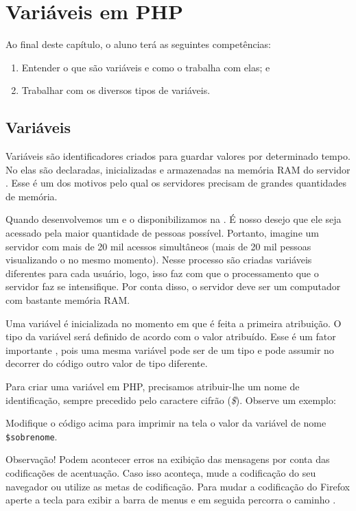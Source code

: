 \chapter{Variáveis em PHP}

Ao final deste capítulo, o aluno terá as seguintes competências:
\begin{enumerate}
    \item Entender o que são variáveis e como o \php trabalha com elas; e
    \item Trabalhar com os diversos tipos de variáveis.
\end{enumerate}

\section{Variáveis}
\label{variaveis}

Variáveis são identificadores criados para guardar valores por determinado tempo. 
No \php elas são declaradas, inicializadas e armazenadas na memória RAM do servidor \web. 
Esse é um dos motivos pelo qual os servidores precisam de grandes quantidades de memória.

Quando desenvolvemos um \site e o disponibilizamos na \internet. É nosso desejo que ele seja
acessado pela maior quantidade de pessoas possível. Portanto, imagine um servidor com mais 
de 20 mil acessos simultâneos (mais de 20 mil pessoas visualizando o \site no mesmo momento).
Nesse processo são criadas variáveis diferentes para cada usuário, logo, isso faz com que o 
processamento que o servidor faz se intensifique. Por conta disso, o servidor deve ser um 
computador com bastante memória RAM.

Uma variável é inicializada no momento em que é feita a primeira atribuição. O tipo da
variável será definido de acordo com o valor atribuído. Esse é um fator importante \php, 
pois uma mesma variável pode ser de um tipo e pode assumir no decorrer do código outro 
valor de tipo diferente.

Para criar uma variável em PHP, precisamos atribuir-lhe um nome de identificação, 
sempre precedido pelo caractere cifrão (\textit{\$}). Observe um exemplo:



Modifique o código acima para imprimir na tela o valor da variável de 
nome \texttt{\$sobrenome}.

Observação! Podem acontecer erros na exibição das mensagens por conta 
das codificações de acentuação. Caso isso aconteça, mude a codificação 
do seu navegador ou utilize as metas de codificação. Para mudar a codificação
do Firefox aperte a tecla \keys{\Alt} para exibir a barra de menus e em seguida
percorra o caminho .

